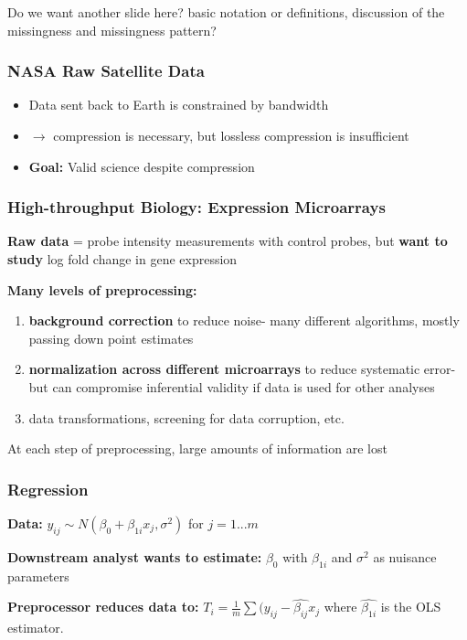\documentclass[10pt, compress]{beamer}
\begin{document}
\begin{frame}[fragile]
    Do we want another slide here? basic notation or definitions, discussion of the missingness and missingness pattern?

\end{frame}

\begin{frame}[fragile]
    \frametitle{NASA Raw Satellite Data}
    \begin{itemize}
        \item Data sent back to Earth is constrained by bandwidth
        \item $\rightarrow$ compression is necessary, but lossless compression is insufficient
        \item \textbf{Goal:} Valid science despite compression
    \end{itemize}
\end{frame}

\begin{frame}[fragile]
    \frametitle{High-throughput Biology: Expression Microarrays}
    
    \textbf{Raw data} = probe intensity measurements with control probes, but \textbf{want to study} log fold change in gene expression
    
    \textbf{Many levels of preprocessing:} 

    \begin{enumerate} [<+->]
    \item \textbf{background correction} to reduce noise- many different algorithms, mostly passing down point estimates
    \vspace*{5mm}
    \item \textbf{normalization across different microarrays} to reduce systematic error- but can compromise inferential validity if data is used for other analyses
    \vspace*{5mm}
    \item data transformations, screening for data corruption, etc.
    \end{enumerate}
    
    At each step of preprocessing, large amounts of information are lost

\end{frame}

\begin{frame}[fragile]
    \frametitle{Regression}
    
    \textbf{Data:} $y_{ij} \sim N(\beta_0 + \beta_{1i}x_j, \sigma^2)$ for $j = 1...m$
    
    \textbf{Downstream analyst wants to estimate:} $\beta_0$ with $\beta_{1i}$ and $\sigma^2$ as nuisance parameters
    
    \textbf{Preprocessor reduces data to:} $T_i = \frac{1}{m}\sum(y_{ij} - \hat{\beta_{ij}}x_j$ where $\hat{\beta_{1i}}$ is the OLS estimator.

\end{frame}
\end{document}
